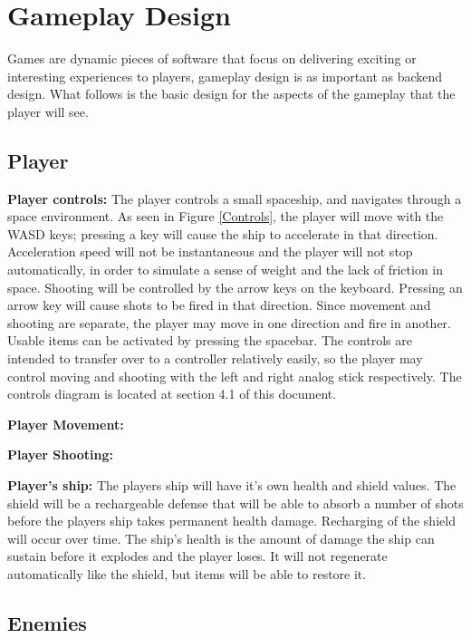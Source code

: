 \documentclass[12pt]{article}       %
\begin{document}
\section{Gameplay Design} %
\label{sec:GPdesign}

Games are dynamic pieces of software that focus on delivering exciting or interesting experiences to players, gameplay design is as important as backend design. What follows is the basic design for the aspects of the gameplay that the player will see.

\subsection{Player} %

	{\bf Player controls: }The player controls a small spaceship, and navigates through a space environment. As seen in Figure \ref{Controls}, the player will move with the WASD keys; pressing a key will cause the ship to accelerate in that direction. Acceleration speed will not be instantaneous and the player will not stop automatically, in order to simulate a sense of weight and the lack of friction in space. Shooting will be controlled by the arrow keys on the keyboard. Pressing an arrow key will cause shots to be fired in that direction. Since movement and shooting are separate, the player may move in one direction and fire in another. Usable items can be activated by pressing the spacebar. The controls are intended to transfer over to a controller relatively easily, so the player may control moving and shooting with the left and right analog stick respectively. The controls diagram is located at section 4.1 of this document.

	{\bf Player Movement:}	

	{\bf Player Shooting:}

	{\bf Player’s ship:} The players ship will have it’s own health and shield values. The shield will be a rechargeable defense that will be able to absorb a number of shots before the players ship takes permanent health damage. Recharging of the shield will occur over time. The ship’s health is the amount of damage the ship can sustain before it explodes and the player loses. It will not regenerate automatically like the shield, but items will be able to restore it.

\subsection{Enemies} %
\end{document}
